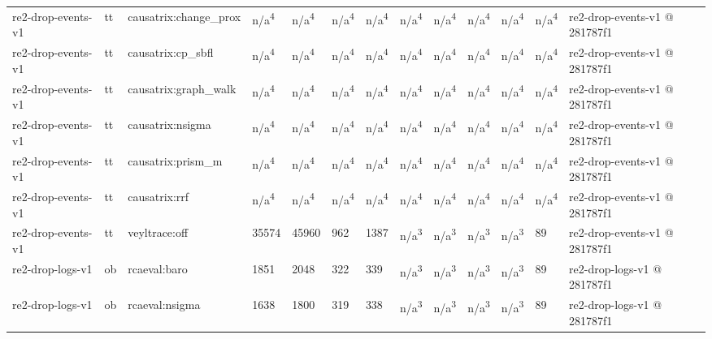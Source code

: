 \begin{table}[t]
\begin{tabular}{lllllllllllll}
re2-drop-events-v1 & tt & causatrix:change\_prox & n/a\textsuperscript{4} & n/a\textsuperscript{4} & n/a\textsuperscript{4} & n/a\textsuperscript{4} & n/a\textsuperscript{4} & n/a\textsuperscript{4} & n/a\textsuperscript{4} & n/a\textsuperscript{4} & n/a\textsuperscript{4} & re2-drop-events-v1 @ 281787f1 \\
re2-drop-events-v1 & tt & causatrix:cp\_sbfl & n/a\textsuperscript{4} & n/a\textsuperscript{4} & n/a\textsuperscript{4} & n/a\textsuperscript{4} & n/a\textsuperscript{4} & n/a\textsuperscript{4} & n/a\textsuperscript{4} & n/a\textsuperscript{4} & n/a\textsuperscript{4} & re2-drop-events-v1 @ 281787f1 \\
re2-drop-events-v1 & tt & causatrix:graph\_walk & n/a\textsuperscript{4} & n/a\textsuperscript{4} & n/a\textsuperscript{4} & n/a\textsuperscript{4} & n/a\textsuperscript{4} & n/a\textsuperscript{4} & n/a\textsuperscript{4} & n/a\textsuperscript{4} & n/a\textsuperscript{4} & re2-drop-events-v1 @ 281787f1 \\
re2-drop-events-v1 & tt & causatrix:nsigma & n/a\textsuperscript{4} & n/a\textsuperscript{4} & n/a\textsuperscript{4} & n/a\textsuperscript{4} & n/a\textsuperscript{4} & n/a\textsuperscript{4} & n/a\textsuperscript{4} & n/a\textsuperscript{4} & n/a\textsuperscript{4} & re2-drop-events-v1 @ 281787f1 \\
re2-drop-events-v1 & tt & causatrix:prism\_m & n/a\textsuperscript{4} & n/a\textsuperscript{4} & n/a\textsuperscript{4} & n/a\textsuperscript{4} & n/a\textsuperscript{4} & n/a\textsuperscript{4} & n/a\textsuperscript{4} & n/a\textsuperscript{4} & n/a\textsuperscript{4} & re2-drop-events-v1 @ 281787f1 \\
re2-drop-events-v1 & tt & causatrix:rrf & n/a\textsuperscript{4} & n/a\textsuperscript{4} & n/a\textsuperscript{4} & n/a\textsuperscript{4} & n/a\textsuperscript{4} & n/a\textsuperscript{4} & n/a\textsuperscript{4} & n/a\textsuperscript{4} & n/a\textsuperscript{4} & re2-drop-events-v1 @ 281787f1 \\
re2-drop-events-v1 & tt & veyltrace:off & 35574 & 45960 & 962 & 1387 & n/a\textsuperscript{3} & n/a\textsuperscript{3} & n/a\textsuperscript{3} & n/a\textsuperscript{3} & 89 & re2-drop-events-v1 @ 281787f1 \\
re2-drop-logs-v1 & ob & rcaeval:baro & 1851 & 2048 & 322 & 339 & n/a\textsuperscript{3} & n/a\textsuperscript{3} & n/a\textsuperscript{3} & n/a\textsuperscript{3} & 89 & re2-drop-logs-v1 @ 281787f1 \\
re2-drop-logs-v1 & ob & rcaeval:nsigma & 1638 & 1800 & 319 & 338 & n/a\textsuperscript{3} & n/a\textsuperscript{3} & n/a\textsuperscript{3} & n/a\textsuperscript{3} & 89 & re2-drop-logs-v1 @ 281787f1 \\

\end{tabular}
\end{table}
